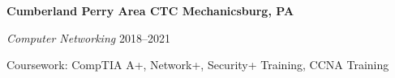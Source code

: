 \textbf{Cumberland Perry Area CTC \hfill Mechanicsburg, PA} \par
\textit{Computer Networking} \hfill 2018--2021\par
Coursework: CompTIA A+, Network+, Security+ Training, CCNA Training \par

